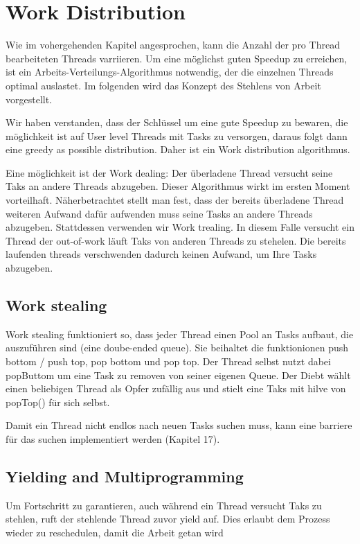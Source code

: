 \section{Work Distribution}


Wie im vohergehenden Kapitel angesprochen, kann die Anzahl der pro Thread bearbeiteten Threads varriieren. Um eine möglichst guten Speedup zu erreichen, ist ein Arbeits-Verteilungs-Algorithmus notwendig, der die einzelnen Threads optimal auslastet. Im folgenden wird das Konzept des Stehlens von Arbeit vorgestellt.





Wir haben verstanden, dass der Schlüssel um eine gute Speedup zu bewaren, die möglichkeit ist auf User level Threads mit Tasks zu versorgen, daraus folgt dann eine greedy as possible distribution. Daher ist ein Work distribution algorithmus.

Eine möglichkeit ist der Work dealing: Der überladene Thread versucht seine Taks an andere Threads abzugeben. Dieser Algorithmus wirkt im ersten Moment vorteilhaft. Näherbetrachtet stellt man fest, dass der bereits überladene Thread weiteren Aufwand dafür aufwenden muss seine Tasks an andere Threads abzugeben. Stattdessen verwenden wir Work trealing. In diesem Falle versucht ein Thread der out-of-work läuft Taks von anderen Threads zu stehelen. Die bereits laufenden threads verschwenden dadurch keinen Aufwand, um Ihre Tasks abzugeben.

\subsection{Work stealing}

Work stealing funktioniert so, dass jeder Thread einen Pool an Tasks aufbaut, die auszuführen sind (eine doube-ended queue). Sie beihaltet die funktionionen push bottom / push top, pop bottom und pop top. Der Thread selbst nutzt dabei popButtom um eine Task zu removen von seiner eigenen Queue. Der Diebt wählt einen beliebigen Thread als Opfer zufällig aus und stielt eine Taks mit hilve von popTop() für sich selbst. 

Damit ein Thread nicht endlos nach neuen Tasks suchen muss, kann eine barriere für das suchen implementiert werden (Kapitel 17).

\subsection{Yielding and Multiprogramming}

Um Fortschritt zu garantieren, auch während ein Thread versucht Taks zu stehlen, ruft der stehlende Thread zuvor yield auf. Dies erlaubt dem Prozess wieder zu reschedulen, damit die Arbeit getan wird


